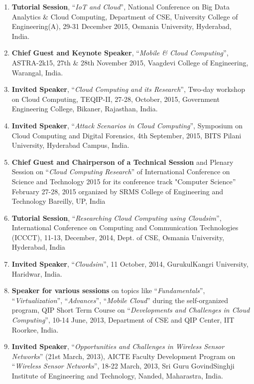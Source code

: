 \begin{enumerate}
\item
\textbf{Tutorial Session}, “\textit{IoT and Cloud}”, National Conference on Big Data Analytics \& Cloud Computing, Department of CSE, University College of Engineering(A), 29-31 December 2015, Osmania University, Hyderabad, India.

\item
\textbf{Chief Guest and Keynote Speaker}, “\textit{Mobile \& Cloud Computing}”, ASTRA-2k15, 27th \& 28th November 2015, Vaagdevi College of Engineering, Warangal, India.

\item
\textbf{Invited Speaker}, “\textit{Cloud Computing and its Research}”, Two-day workshop on Cloud Computing, TEQIP-II, 27-28, October, 2015, Government Engineering College, Bikaner, Rajasthan, India.

\item
\textbf{Invited Speaker}, “\textit{Attack Scenarios in Cloud Computing}”, Symposium on Cloud Computing and Digital Forensics, 4th September, 2015, BITS Pilani University, Hyderabad Campus, India.

\item
\textbf{Chief Guest and Chairperson of a Technical Session} and Plenary Session on “\textit{Cloud Computing Research}” of International Conference on Science and Technology 2015 for its conference track "Computer Science” February 27-28, 2015 organized by SRMS College of Engineering and Technology Bareilly, UP, India

\item
\textbf{Tutorial Session}, “\textit{Researching Cloud Computing using Cloudsim}”, International Conference on Computing and Communication Technologies (ICCCT), 11-13, December, 2014, Dept. of CSE, Osmania University, Hyderabad, India

\item
\textbf{Invited Speaker}, “\textit{Cloudsim}”, 11 October, 2014, GurukulKangri University, Haridwar, India.

\item
\textbf{Speaker for various sessions} on topics like “\textit{Fundamentals}”, “\textit{Virtualization}”, “\textit{Advances}”, “\textit{Mobile Cloud}” during the self-organized program, QIP Short Term Course on “\textit{Developments and Challenges in Cloud Computing}”, 10-14 June, 2013, Department of CSE and QIP Center, IIT Roorkee, India.

\item
\textbf{Invited Speaker}, “\textit{Opportunities and Challenges in Wireless Sensor Networks}” (21st March, 2013), AICTE Faculty Development Program on “\textit{Wireless Sensor Networks}”, 18-22 March, 2013, Sri Guru GovindSinghji Institute of Engineering and Technology, Nanded, Maharastra, India.


\end{enumerate}
